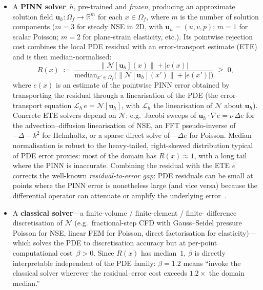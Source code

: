 \documentclass[11pt]{article}
\newcommand{\R}{\mathbb{R}}
\newcommand{\Lcal}{\mathcal{L}}
\newcommand{\Ncal}{\mathcal{N}}
\begin{document}
\begin{itemize}
\item A \textbf{PINN solver}~$h$, pre-trained and \emph{frozen}, producing an
  approximate solution field $\mathbf{u}_h \colon \Omega_f \to \R^m$ for each
  $x \in \Omega_f$, where $m$ is the number of solution components ($m = 3$ for
  steady NSE in 2D, with $\mathbf{u}_h = (u, v, p)$; $m = 1$ for scalar Poisson;
  $m = 2$ for plane-strain elasticity, etc.).  Its pointwise rejection cost
  combines the local PDE residual with an error-transport estimate (ETE) and is
  then median-normalised:
  \begin{equation}\label{eq:residual-def}
    R(x) \;\coloneqq\;
      \frac{\bigl\|\Ncal[\mathbf{u}_h](x)\bigr\| + \bigl|e(x)\bigr|}
           {\mathrm{median}_{x' \in \Omega_f}
            \bigl(\bigl\|\Ncal[\mathbf{u}_h](x')\bigr\| + \bigl|e(x')\bigr|\bigr)}
      \;\ge\; 0,
  \end{equation}
  where $e(x)$ is an estimate of the pointwise PINN error obtained by transporting
  the residual through a linearisation of the PDE (the error-transport equation
  $\Lcal_h\,e = \Ncal[\mathbf{u}_h]$, with $\Lcal_h$ the linearisation of $\Ncal$
  about $\mathbf{u}_h$).  Concrete ETE solvers depend on $\Ncal$: e.g.\ Jacobi
  sweeps of $\mathbf{u}_h \!\cdot\! \nabla e = \nu\,\Delta e$ for the
  advection--diffusion linearisation of NSE, an FFT pseudo-inverse of
  $-\Delta - k^2$ for Helmholtz, or a sparse direct solve of $-\Delta e$ for
  Poisson.  Median normalisation is robust to the heavy-tailed, right-skewed
  distribution typical of PDE error proxies: most of the domain has
  $R(x) \approx 1$, with a long tail where the PINN is inaccurate.  Combining the
  residual with the ETE $e$ corrects the well-known \emph{residual-to-error gap}:
  PDE residuals can be small at points where the PINN error is nonetheless large
  (and vice versa) because the differential operator can attenuate or amplify the
  underlying error~\cite{verfurth2013posteriori}.

\item A \textbf{classical solver}---a finite-volume / finite-element / finite-
  difference discretisation of $\Ncal$ (e.g.\ fractional-step CFD with
  Gauss--Seidel pressure Poisson for NSE, linear FEM for Poisson, direct
  factorisation for elasticity)---which solves the PDE to discretisation accuracy
  but at per-point computational cost~$\beta > 0$.  Since $R(x)$ has median~$1$,
  $\beta$ is directly interpretable independent of the PDE family: $\beta = 1.2$
  means ``invoke the classical solver wherever the residual--error cost exceeds
  $1.2\times$ the domain median.''
\end{itemize}
\end{document}

